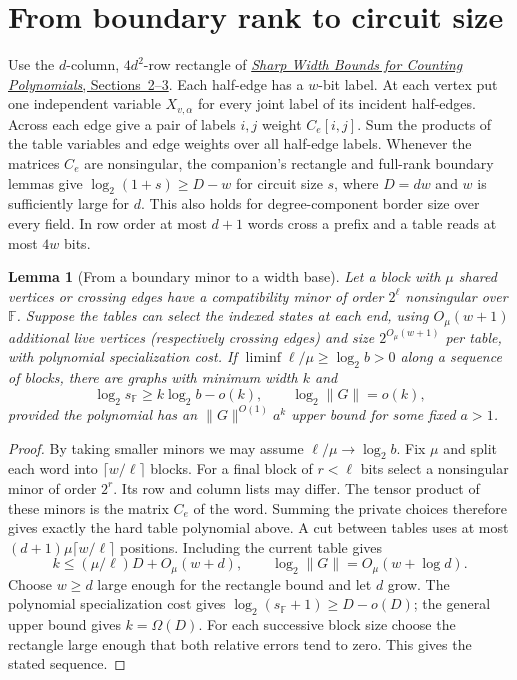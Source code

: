\documentclass[11pt]{article}
\newtheorem{lemma}[theorem]{Lemma}
\theoremstyle{definition}
\newcommand{\F}{\mathbb F}
\begin{document}
\section{From boundary rank to circuit size}\label{sec:transfer}

Use the \(d\)-column, \(4d^2\)-row rectangle of \href{sharp-pathwidth-bases.pdf}{\emph{Sharp Width Bounds for Counting Polynomials}, Sections~2--3}. Each half-edge has a \(w\)-bit label. At each vertex put one independent variable \(X_{v,\alpha}\) for every joint label of its incident half-edges. Across each edge give a pair of labels \(i,j\) weight \(C_e[i,j]\). Sum the products of the table variables and edge weights over all half-edge labels. Whenever the matrices \(C_e\) are nonsingular, the companion's rectangle and full-rank boundary lemmas give \(\log_2(1+s)\ge D-w\) for circuit size \(s\), where \(D=dw\) and \(w\) is sufficiently large for \(d\). This also holds for degree-component border size over every field. In row order at most \(d+1\) words cross a prefix and a table reads at most \(4w\) bits.

\begin{lemma}[From a boundary minor to a width base]\label{lem:transfer}
Let a block with \(\mu\) shared vertices or crossing edges have a compatibility minor of order \(2^\ell\) nonsingular over \(\F\). Suppose the tables can select the indexed states at each end, using \(O_\mu(w+1)\) additional live vertices (respectively crossing edges) and size \(2^{O_\mu(w+1)}\) per table, with polynomial specialization cost. If \(\liminf\ell/\mu\ge\log_2 b>0\) along a sequence of blocks, there are graphs with minimum width \(k\) and
\[
             \log_2 s_\F\ge k\log_2 b-o(k),\qquad \log_2 \|G\|=o(k),
\]
provided the polynomial has an \(\|G\|^{O(1)}a^k\) upper bound for some fixed \(a>1\).
\end{lemma}
\begin{proof}
By taking smaller minors we may assume \(\ell/\mu\to\log_2 b\). Fix \(\mu\) and split each word into \(\lceil w/\ell\rceil\) blocks. For a final block of \(r<\ell\) bits select a nonsingular minor of order \(2^r\). Its row and column lists may differ. The tensor product of these minors is the matrix \(C_e\) of the word. Summing the private choices therefore gives exactly the hard table polynomial above. A cut between tables uses at most \((d+1)\mu\lceil w/\ell\rceil\) positions. Including the current table gives
\[
 k\le(\mu/\ell)D+O_\mu(w+d),\qquad \log_2 \|G\|=O_\mu(w+\log d).
\]
Choose \(w\ge d\) large enough for the rectangle bound and let \(d\) grow. The polynomial specialization cost gives \(\log_2(s_\F+1)\ge D-o(D)\); the general upper bound gives \(k=\Omega(D)\). For each successive block size choose the rectangle large enough that both relative errors tend to zero. This gives the stated sequence.
\end{proof}
\end{document}
